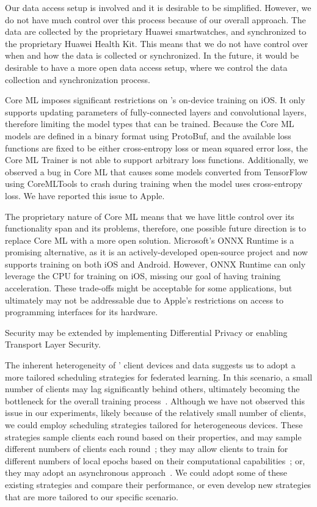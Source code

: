 Our data access setup is involved and it is desirable to be simplified.
However, we do not have much control over this process because of
our overall approach.
The data are collected by the proprietary Huawei smartwatches,
and synchronized to the proprietary Huawei Health Kit.
This means that we do not have control over when and how the data is
collected or synchronized.
In the future, it would be desirable to have a more open data access setup,
where we control the data collection and synchronization process.

Core ML imposes significant restrictions on \fedkit's on-device training on iOS.
It only supports updating parameters of fully-connected layers and convolutional
layers, therefore limiting the model types that can be trained.
Because the Core ML models are defined in a binary format using ProtoBuf,
and the available loss functions are fixed to be either cross-entropy loss or
mean squared error loss, the Core ML Trainer is not able to support arbitrary
loss functions.
Additionally, we observed a bug in Core ML that causes some models converted
from TensorFlow using CoreMLTools to crash during training when the model uses
cross-entropy loss.
We have reported this issue to Apple.

The proprietary nature of Core ML means that we have little control over its
functionality span and its problems, therefore,
one possible future direction is to replace Core ML with a more open solution.
Microsoft's ONNX Runtime is a promising alternative,
as it is an actively-developed open-source project and now supports training on
both iOS and Android.
However, ONNX Runtime can only leverage the CPU for training on iOS,
missing our goal of having training acceleration.
These trade-offs might be acceptable for some applications,
but ultimately may not be addressable due to Apple's restrictions on access to
programming interfaces for its hardware.

Security may be extended by implementing Differential Privacy or
enabling Transport Layer Security.

The inherent heterogeneity of \fedcampus' client devices and data suggests us to
adopt a more tailored scheduling strategies for federated learning.
In this scenario, a small number of clients may lag significantly behind others,
ultimately becoming the bottleneck for the overall training
process~\cite{chen2020asynchronous,zheng2017asynchronous}.
Although we have not observed this issue in our experiments,
likely because of the relatively small number of clients,
we could employ scheduling strategies tailored for heterogeneous devices.
These strategies sample clients each round based on their properties,
and may sample different numbers of clients each
round~\cite[e.g.,][]{zhang2022fedada,karimireddy2019error,reddi2020adaptive,luo2021cost};
they may allow clients to train for different numbers of local epochs based on
their computational capabilities~\cite{li2020federated}; or,
they may adopt an asynchronous
approach~\cite{chilimbi2014project,zhu2022online,huba2022papaya,sun2022fedsea}.
We could adopt some of these existing strategies and compare their performance,
or even develop new strategies that are more tailored to our specific scenario.
